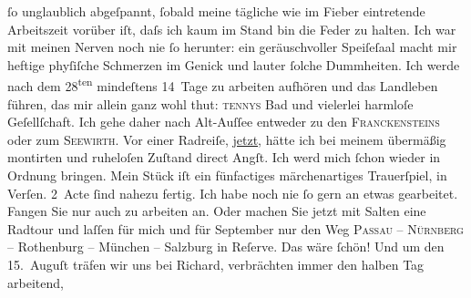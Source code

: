 \begin{ledgroupsized}[t]{13cm}
                    ſo unglaublich abgeſpannt, ſobald meine tägliche wie im Fieber eintretende
                    Arbeitszeit vorüber iſt, daſs {\pb}ich kaum im Stand bin die Feder zu halten.\pend
           \pstart
           Ich war mit meinen Nerven noch nie ſo herunter: ein geräuschvoller Speiſeſaal
                    macht mir heftige phyſiſche Schmerzen im Genick und lauter ſolche Dummheiten.
                    Ich werde nach dem 28\textsuperscript{ten} mindeſtens 14 Tage zu arbeiten aufhören {\pb}und das Landleben führen,
                        das mir allein ganz wohl thut: \textsc{tennys} Bad und vielerlei harmloſe Geſellſchaft. Ich
                    gehe daher nach Alt-Auſſee entweder zu den
                        \textsc{Franckensteins} oder zum \textsc{Seewirth}. Vor einer Radreiſe, \uline{jetzt}, hätte ich bei
                    meinem übermäßig montirten und ruheloſen Zuſtand direct Angſt. {\pb}Ich werd mich ſchon wieder
                    in Ordnung bringen.\pend
           \pstart
           Mein Stück iſt ein
                    fünfactiges märchenartiges Trauerſpiel, in Verſen. 2 Acte ſind nahezu fertig.
                    Ich habe noch nie ſo gern an etwas gearbeitet. Fangen Sie nur auch zu arbeiten
                    an.\pend
           \pstart
           Oder machen Sie jetzt mit Salten eine Radtour
                        {\pb}und laſſen für mich und
                    für September nur den Weg \textsc{Passau} – \textsc{Nürnberg} – Rothenburg – München – Salzburg in
                    Reſerve. Das wäre ſchön!\pend
           \pstart
           Und um den 15. Auguſt träfen wir uns bei Richard, verbrächten immer den halben Tag arbeitend,

\end{ledgroupsized}
